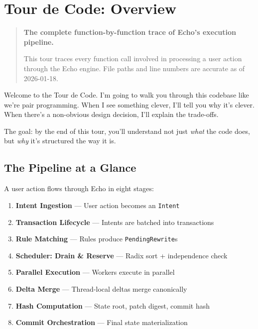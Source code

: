 
\chapter{Tour de Code: Overview}
\label{chap:tour-overview}

\begin{quote}
\textbf{The complete function-by-function trace of Echo's execution pipeline.}

This tour traces every function call involved in processing a user action through the Echo engine. File paths and line numbers are accurate as of 2026-01-18.
\end{quote}

\begin{commentary}
Welcome to the Tour de Code. I'm going to walk you through this codebase like we're pair programming. When I see something clever, I'll tell you why it's clever. When there's a non-obvious design decision, I'll explain the trade-offs.

The goal: by the end of this tour, you'll understand not just \emph{what} the code does, but \emph{why} it's structured the way it is.
\end{commentary}

\section{The Pipeline at a Glance}

A user action flows through Echo in eight stages:

\begin{enumerate}
    \item \textbf{Intent Ingestion} --- User action becomes an \texttt{Intent}
    \item \textbf{Transaction Lifecycle} --- Intents are batched into transactions
    \item \textbf{Rule Matching} --- Rules produce \texttt{PendingRewrite}s
    \item \textbf{Scheduler: Drain \& Reserve} --- Radix sort + independence check
    \item \textbf{Parallel Execution} --- Workers execute in parallel
    \item \textbf{Delta Merge} --- Thread-local deltas merge canonically
    \item \textbf{Hash Computation} --- State root, patch digest, commit hash
    \item \textbf{Commit Orchestration} --- Final state materialization
\end{enumerate}

